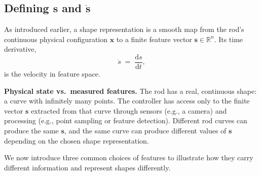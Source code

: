 \documentclass[11pt,a4paper]{article}
\begin{document}
\subsection*{Defining \texorpdfstring{$\mathbf{s}$}{s} and \texorpdfstring{$\dot{\mathbf{s}}$}{ds/dt}}

As introduced earlier, a shape representation is a smooth map from the rod's continuous physical
configuration $\mathbf{x}$ to a finite feature vector $\mathbf{s}\in\mathbb{R}^{n}$. Its time derivative,
\[
    \dot s \;=\; \frac{\mathrm{d}s}{\mathrm{d}t},
\]
is the velocity in feature space.

\begin{tcolorbox}[notebox]
\textbf{Physical state vs.\ measured features.} The rod has a real, continuous shape:
a curve with infinitely many points. The controller has access only to the finite vector
$\mathbf{s}$ extracted from that curve through sensors (e.g., a camera) and processing (e.g., point sampling or feature detection). Different rod curves can produce the same $\mathbf{s}$, and the same curve
can produce different values of $\mathbf{s}$ depending on the chosen shape representation.
\end{tcolorbox}

\noindent We now introduce three common choices of features to illustrate how they carry
different information and represent shapes differently.
\end{document}
